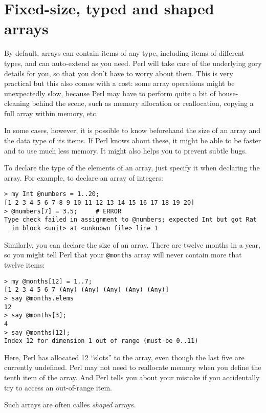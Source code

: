 \section{Fixed-size, typed and shaped arrays}

By default, arrays can contain items of any type, including 
items of different types, and can auto-extend as you need. 
Perl will take care of the underlying gory details for you, 
so that you don't have to worry about them. This is very 
practical but this also comes with a cost: some array 
operations might be unexpectedly slow, because Perl may 
have to perform quite a bit of house-cleaning behind the 
scene, such as memory allocation or reallocation, copying 
a full array within memory, etc.

In some cases, however, it is possible to know beforehand 
the size of an array and the data type of its items. If 
Perl knows about these, it might be able to be faster and 
to use much less memory. It might also helps you 
to prevent subtle bugs.

To declare the type of the elements of an array, just 
specify it when declaring the array. For example, to 
declare an array of integers:

\begin{verbatim}
> my Int @numbers = 1..20;
[1 2 3 4 5 6 7 8 9 10 11 12 13 14 15 16 17 18 19 20]
> @numbers[7] = 3.5;     # ERROR
Type check failed in assignment to @numbers; expected Int but got Rat
  in block <unit> at <unknown file> line 1
\end{verbatim}
%

Similarly, you can declare the size of an array. There are 
twelve months in a year, so you might tell Perl that your 
\verb'@months' array will never contain more that twelve 
items:
\begin{verbatim}
> my @months[12] = 1..7;
[1 2 3 4 5 6 7 (Any) (Any) (Any) (Any) (Any)]
> say @months.elems
12
> say @months[3];
4
> say @months[12];
Index 12 for dimension 1 out of range (must be 0..11)
\end{verbatim}
%

Here, Perl has allocated 12 ``slots'' to the array, even though 
the last five are currently undefined. Perl may not need 
to reallocate memory when you define the tenth item of 
the array. And Perl tells you about your mistake if you 
accidentally try to access an out-of-range item.

Such arrays are often calles \emph{shaped} arrays.

